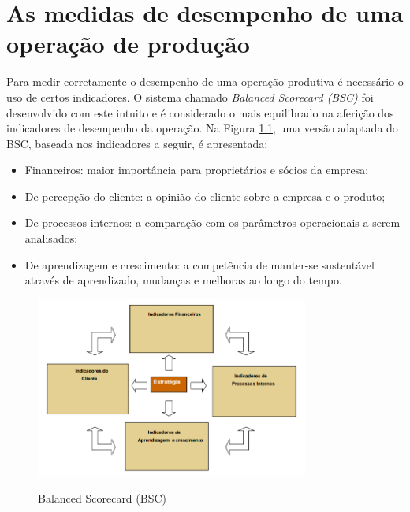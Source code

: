 \chapter{ As medidas de desempenho de uma operação de produção}
\label{chap:medida_desempenho_operacao_prod}

Para medir corretamente o desempenho de uma operação produtiva é necessário o uso de certos indicadores. O sistema chamado \textit{Balanced Scorecard (BSC)} foi desenvolvido com este intuito e é considerado o mais equilibrado na aferição dos indicadores de desempenho da operação.
Na Figura \ref{fig:balanced_scorecard}, uma versão adaptada do BSC, baseada nos indicadores a seguir, é apresentada:

\begin{itemize}
    \item Financeiros: maior importância para proprietários e sócios da empresa;
    \item De percepção do cliente: a opinião do cliente sobre a empresa e o produto;
    \item De processos internos: a comparação com os parâmetros operacionais a serem analisados;
    \item De aprendizagem e crescimento: a competência de manter-se sustentável através de aprendizado, mudanças e melhoras ao longo do tempo.
\end{itemize}


\begin{figure}[H]
    \centering
    \caption{Balanced Scorecard (BSC)}
    \includegraphics[width =0.8\textwidth]{images/bsc.png}
    \label{fig:balanced_scorecard}
\end{figure}

